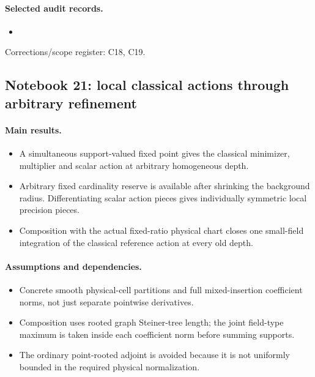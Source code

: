 \paragraph{Selected audit records.}
\begingroup\small
\begin{itemize}
\item {}
\end{itemize}
\endgroup
Corrections/scope register: C18, C19.\par

\subsection{Notebook 21: local classical actions through arbitrary refinement}
\label{hnc-21}
\noindent{}\par

\paragraph{Main results.}
\begin{itemize}
\item A simultaneous support-valued fixed point gives the classical minimizer, multiplier and scalar action at arbitrary homogeneous depth.
\item Arbitrary fixed cardinality reserve is available after shrinking the background radius. Differentiating scalar action pieces gives individually symmetric local precision pieces.
\item Composition with the actual fixed-ratio physical chart closes one small-field integration of the classical reference action at every old depth.
\end{itemize}

\paragraph{Assumptions and dependencies.}
\begin{itemize}
\item Concrete smooth physical-cell partitions and full mixed-insertion coefficient norms, not just separate pointwise derivatives.
\item Composition uses rooted graph Steiner-tree length; the joint field-type maximum is taken inside each coefficient norm before summing supports.
\item The ordinary point-rooted adjoint is avoided because it is not uniformly bounded in the required physical normalization.
\end{itemize}

